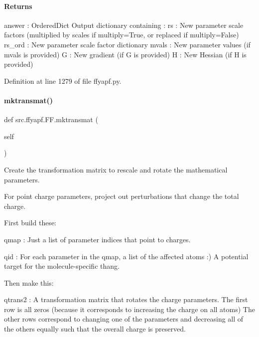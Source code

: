 \paragraph*{Returns }

answer \+: Ordered\+Dict Output dictionary containing \+: \textquotesingle{}rs\textquotesingle{} \+: New parameter scale factors (multiplied by scales if multiply=True, or replaced if multiply=False) \textquotesingle{}rs\+\_\+ord\textquotesingle{} \+: New parameter scale factor dictionary \textquotesingle{}mvals\textquotesingle{} \+: New parameter values (if mvals is provided) \textquotesingle{}G\textquotesingle{} \+: New gradient (if G is provided) \textquotesingle{}H\textquotesingle{} \+: New Hessian (if H is provided) 

Definition at line 1279 of file ffyapf.\+py.

\mbox{\label{classsrc_1_1ffyapf_1_1FF_ab540e44d9ab8dccb60048694e460c4fc}} 
\paragraph{\texorpdfstring{mktransmat()}{mktransmat()}}
{\footnotesize\ttfamily def src.\+ffyapf.\+F\+F.\+mktransmat (\begin{DoxyParamCaption}\item[{}]{self }\end{DoxyParamCaption})}



Create the transformation matrix to rescale and rotate the mathematical parameters. 

For point charge parameters, project out perturbations that change the total charge.

First build these\+:

\textquotesingle{}qmap\textquotesingle{} \+: Just a list of parameter indices that point to charges.

\textquotesingle{}qid\textquotesingle{} \+: For each parameter in the qmap, a list of the affected atoms \+:) A potential target for the molecule-\/specific thang.

Then make this\+:

\textquotesingle{}qtrans2\textquotesingle{} \+: A transformation matrix that rotates the charge parameters. The first row is all zeros (because it corresponds to increasing the charge on all atoms) The other rows correspond to changing one of the parameters and decreasing all of the others equally such that the overall charge is preserved.

